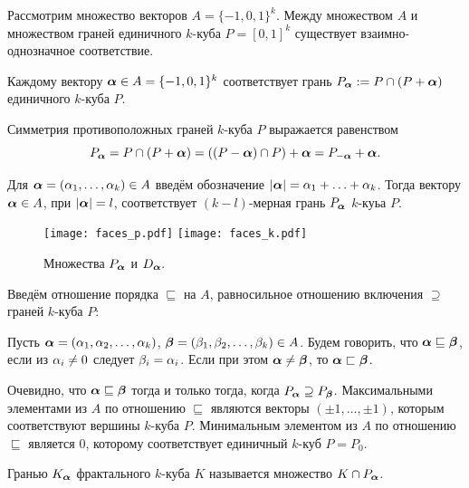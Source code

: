 Рассмотрим множество векторов $A=\{-1,0,1\}^k$.
Между множеством $A$ и множеством граней единичного $k$-куба $P=[0,1]^k$ существует взаимно-однозначное соответствие.

\begin{definition}\label{dfn:Pa}
Каждому вектору ${\bm{\alpha}}\in A=\{-1,0,1\}^k$ соответствует грань $P_{\bm{\alpha}}:=P\cap(P+{\bm{\alpha}})$ единичного $k$-куба $P$.
\end{definition}

Симметрия противоположных граней $k$-куба $P$ выражается равенством 
$$P_{\bm{\alpha}}=P\cap(P+{\bm{\alpha}})=((P-{\bm{\alpha}})\cap P)+{\bm{\alpha}}=P_{-{\bm{\alpha}}}+{\bm{\alpha}}.$$

Для ${\bm{\alpha}}=(\alpha_1,\ldots,\alpha_k)\in A$ введём обозначение $|{\bm{\alpha}}|=\alpha_1+\ldots+\alpha_k$.
Тогда вектору ${\bm{\alpha}}\in A$, при $|{\bm{\alpha}}|=l$, соответствует $(k-l)$-мерная грань $P_{\bm{\alpha}}$ $k$-куьа $P$.

\begin{figure}[h!]
 \centering
 \texttt{[image: faces\_p.pdf]}
 \hfill
 \texttt{[image: faces\_k.pdf]}
 \caption{Множества $P_{\bm{\alpha}}$ и $D_{\bm{\alpha}}.$}
 \label{fig:faces}
\end{figure}

Введём отношение порядка $\sqsubseteq$ на $A$, равносильное отношению включения $\supseteq$ граней $k$-куба $P$:

\begin{definition}\label{Aorder}
Пусть ${\bm{\alpha}}=(\alpha_1,\alpha_2,\ldots,\alpha_k)$, ${\bm{\beta}}=(\beta_1,\beta_2,\ldots,\beta_k)\in A$.
Будем говорить, что ${\bm{\alpha}}\sqsubseteq{\bm{\beta}}$, если из $\alpha_i\neq 0$ следует $\beta_i=\alpha_i$.
Если при этом ${\bm{\alpha}}\neq{\bm{\beta}}$, то ${\bm{\alpha}}\sqsubset{\bm{\beta}}$.
\end{definition}

Очевидно, что ${\bm{\alpha}}\sqsubseteq{\bm{\beta}}$ тогда и только тогда, когда $P_{\bm{\alpha}}\supseteq P_{\bm{\beta}}$. 
Максимальными элементами из $A$ по отношению $\sqsubseteq$ являются векторы $(\pm 1,\ldots,\pm 1)$, которым соответствуют вершины $k$-куба $P$.
Минимальным элементом из $A$ по отношению $\sqsubseteq$ является $0$, которому соответствует единичный $k$-куб $P=P_{0}$.

\begin{definition}\label{def:K_alpha}
Гранью $K_{\bm{\alpha}}$ фрактального $k$-куба $K$ называется множество $K\cap P_{\bm{\alpha}}$.
\end{definition}


